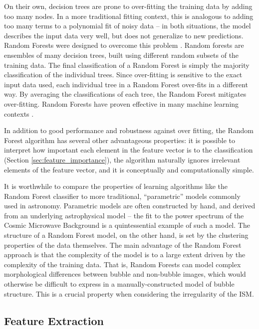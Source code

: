 \documentclass[preprint]{aastex}
\begin{document}
On their own, decision trees are prone to over-fitting the training data by adding too many nodes. In a more traditional fitting context, this is analogous to adding too many terms to a polynomial fit of noisy data -- in both situations, the model describes the input data very well, but does not generalize to new predictions. Random Forests were designed to overcome this problem \citep{Breiman01}. Random forests are ensembles of many decision trees, built using different random subsets of the training data. The final classification of a Random Forest is simply the majority classification of the individual trees. Since over-fitting is sensitive to the exact input data used, each individual tree in a Random Forest over-fits in a different way. By averaging the classifications of each tree, the Random Forest mitigates over-fitting. Random Forests have proven effective in many machine learning contexts \citep{Kuhn13}.

In addition to good performance and robustness against over fitting, the Random Forest algorithm has several other advantageous properties: it is possible to interpret how important each element in the feature vector is to the classification (Section \ref{sec:feature_importance}), the algorithm naturally ignores irrelevant elements of the feature vector, and it is conceptually and computationally simple.

It is worthwhile to compare the properties of learning algorithms like the Random Forest classifier to more traditional, ``parametric'' models commonly used in astronomy. Parametric models are often constructed by hand, and derived from an underlying astrophysical model -- the fit to the power spectrum of the Cosmic Microwave Background is a quintessential example of such a model. The structure of a Random Forest model, on the other hand, is set by the clustering properties of the data themselves. The main advantage of the Random Forest approach is that the complexity of the model is to a large extent driven by the complexity of the training data. That is, Random Forests can model complex morphological differences between bubble and non-bubble images, which would otherwise be difficult to express in a manually-constructed model of bubble structure. This is a crucial property when considering the irregularity of the ISM.

\subsection{Feature Extraction}
\label{sec:method_feature_extraction}
\end{document}
